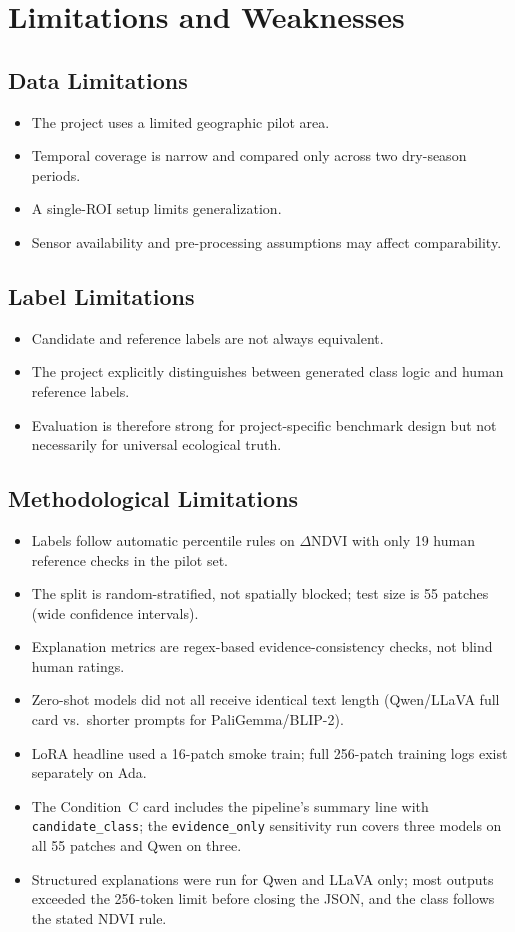 \documentclass[11pt]{article}
\begin{document}
\section{Limitations and Weaknesses}

\subsection{Data Limitations}
\begin{itemize}
    \item The project uses a limited geographic pilot area.
    \item Temporal coverage is narrow and compared only across two dry-season periods.
    \item A single-ROI setup limits generalization.
    \item Sensor availability and pre-processing assumptions may affect comparability.
\end{itemize}

\subsection{Label Limitations}
\begin{itemize}
    \item Candidate and reference labels are not always equivalent.
    \item The project explicitly distinguishes between generated class logic and human reference labels.
    \item Evaluation is therefore strong for project-specific benchmark design but not necessarily for universal ecological truth.
\end{itemize}

\subsection{Methodological Limitations}
\begin{itemize}
    \item Labels follow automatic percentile rules on $\Delta$NDVI with only 19 human reference checks in the pilot set.
    \item The split is random-stratified, not spatially blocked; test size is 55 patches (wide confidence intervals).
    \item Explanation metrics are regex-based evidence-consistency checks, not blind human ratings.
    \item Zero-shot models did not all receive identical text length (Qwen/LLaVA full card vs.\ shorter prompts for PaliGemma/BLIP-2).
    \item LoRA headline used a 16-patch smoke train; full 256-patch training logs exist separately on Ada.
    \item The Condition~C card includes the pipeline's summary line with \texttt{candidate\_class}; the \texttt{evidence\_only} sensitivity run covers three models on all 55 patches and Qwen on three.
    \item Structured explanations were run for Qwen and LLaVA only; most outputs exceeded the 256-token limit before closing the JSON, and the class follows the stated NDVI rule.
\end{itemize}
\end{document}
